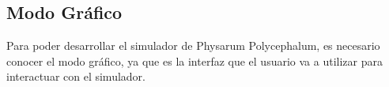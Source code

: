 \subsection{Modo Gr\'afico}
\label{sec:ModoGrafico}
    Para poder desarrollar el simulador de Physarum Polycephalum, es necesario conocer el modo gr\'afico, 
        ya que es la interfaz que el usuario va a utilizar para interactuar con el simulador.
    \vskip 0.5cm
    